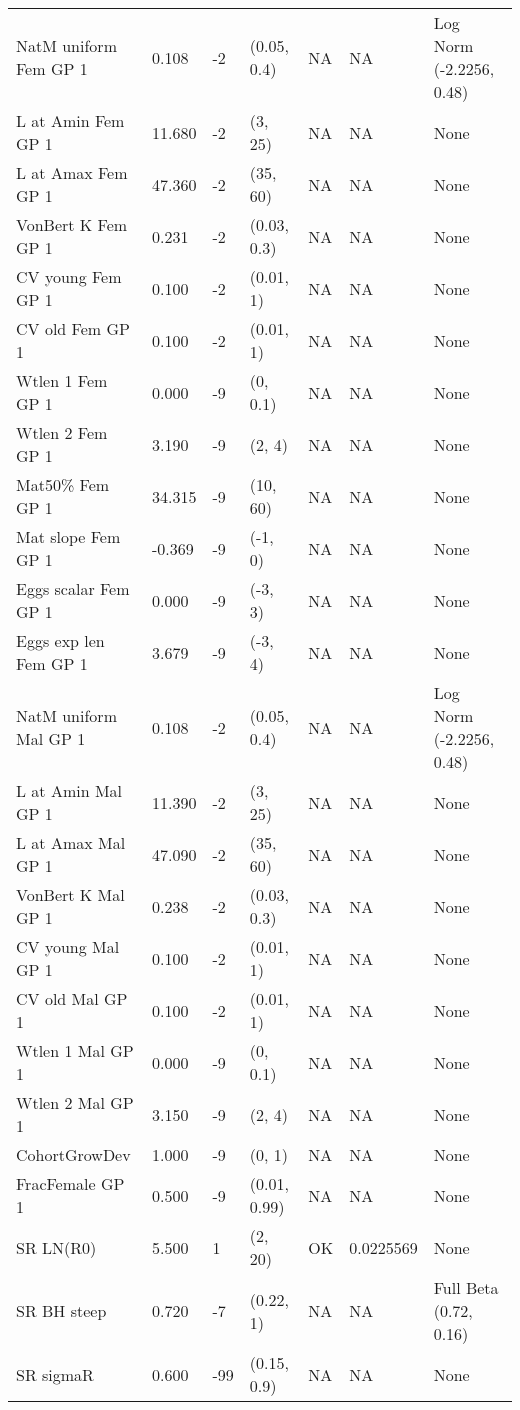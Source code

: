 \documentclass[11pt,
  english,
  letterpaper,
]{article}
\begin{document}
\begin{landscape}
\begin{longtable}[t]{>{\raggedright\arraybackslash}p{7cm}lllll>{\raggedright\arraybackslash}p{4cm}}
\endfoot
\bottomrule
\endlastfoot
NatM uniform Fem GP 1 & 0.108 & -2 & (0.05, 0.4) & NA & NA & Log Norm (-2.2256, 0.48)\\
L at Amin Fem GP 1 & 11.680 & -2 & (3, 25) & NA & NA & None\\
L at Amax Fem GP 1 & 47.360 & -2 & (35, 60) & NA & NA & None\\
VonBert K Fem GP 1 & 0.231 & -2 & (0.03, 0.3) & NA & NA & None\\
CV young Fem GP 1 & 0.100 & -2 & (0.01, 1) & NA & NA & None\\
CV old Fem GP 1 & 0.100 & -2 & (0.01, 1) & NA & NA & None\\
Wtlen 1 Fem GP 1 & 0.000 & -9 & (0, 0.1) & NA & NA & None\\
Wtlen 2 Fem GP 1 & 3.190 & -9 & (2, 4) & NA & NA & None\\
Mat50\% Fem GP 1 & 34.315 & -9 & (10, 60) & NA & NA & None\\
Mat slope Fem GP 1 & -0.369 & -9 & (-1, 0) & NA & NA & None\\
Eggs scalar Fem GP 1 & 0.000 & -9 & (-3, 3) & NA & NA & None\\
Eggs exp len Fem GP 1 & 3.679 & -9 & (-3, 4) & NA & NA & None\\
NatM uniform Mal GP 1 & 0.108 & -2 & (0.05, 0.4) & NA & NA & Log Norm (-2.2256, 0.48)\\
L at Amin Mal GP 1 & 11.390 & -2 & (3, 25) & NA & NA & None\\
L at Amax Mal GP 1 & 47.090 & -2 & (35, 60) & NA & NA & None\\
VonBert K Mal GP 1 & 0.238 & -2 & (0.03, 0.3) & NA & NA & None\\
CV young Mal GP 1 & 0.100 & -2 & (0.01, 1) & NA & NA & None\\
CV old Mal GP 1 & 0.100 & -2 & (0.01, 1) & NA & NA & None\\
Wtlen 1 Mal GP 1 & 0.000 & -9 & (0, 0.1) & NA & NA & None\\
Wtlen 2 Mal GP 1 & 3.150 & -9 & (2, 4) & NA & NA & None\\
CohortGrowDev & 1.000 & -9 & (0, 1) & NA & NA & None\\
FracFemale GP 1 & 0.500 & -9 & (0.01, 0.99) & NA & NA & None\\
SR LN(R0) & 5.500 & 1 & (2, 20) & OK & 0.0225569 & None\\
SR BH steep & 0.720 & -7 & (0.22, 1) & NA & NA & Full Beta (0.72, 0.16)\\
SR sigmaR & 0.600 & -99 & (0.15, 0.9) & NA & NA & None\\

\end{longtable}
\end{landscape}
\end{document}
